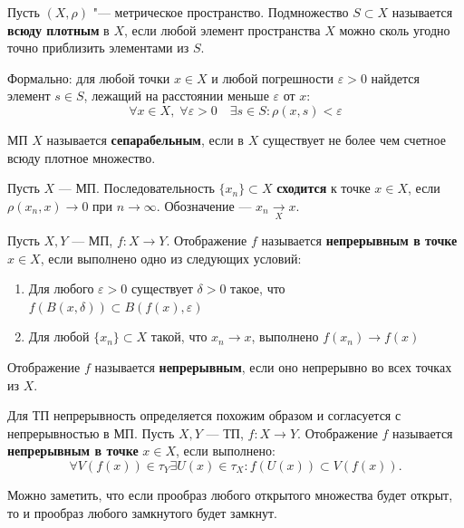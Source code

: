 \begin{definition}
	Пусть $(X, \rho)$ "--- метрическое пространство. Подмножество $S \subset X$ называется \textbf{всюду плотным} в $X$, если любой элемент пространства $X$ можно сколь угодно точно приблизить элементами из $S$.
	
	Формально: для любой точки $x \in X$ и любой погрешности $\varepsilon > 0$ найдется элемент $s \in S$, лежащий на расстоянии меньше $\varepsilon$ от $x$:
	\[ \forall x \in X, \; \forall \varepsilon > 0 \quad \exists s \in S : \rho(x, s) < \varepsilon \]
\end{definition}

\begin{definition}[Сепарабельность]
	МП $X$ называется \textbf{сепарабельным}, если в $X$ существует не более чем счетное всюду плотное множество.
\end{definition}

\begin{definition}[Сходимость]
	Пусть $X$ — МП. Последовательность $\{x_n\} \subset X$ \textbf{сходится} к точке $x \in X$, если $\rho(x_n, x) \to 0$ при $n \to \infty$. Обозначение — $x_n \xrightarrow[X]{} x$.
\end{definition}

\begin{definition}[Непрерывность в МП]
	Пусть $X, Y$ — МП, $f: X \to Y$. Отображение $f$ называется \textbf{непрерывным в точке} $x \in X$, если выполнено одно из следующих условий:
	\begin{enumerate}
		\item Для любого $\varepsilon > 0$ существует $\delta > 0$ такое, что $f(B(x, \delta)) \subset B(f(x), \varepsilon)$
		\item Для любой $\{x_n\} \subset X$ такой, что $x_n \to x$, выполнено $f(x_n) \to f(x)$
	\end{enumerate}
	Отображение $f$ называется \textbf{непрерывным}, если оно непрерывно во всех точках из $X$.
\end{definition}

\begin{remark}
	Для ТП непрерывность определяется похожим образом и согласуется с непрерывностью в МП. Пусть $X, Y$ — ТП, $f: X \to Y$. Отображение $f$ называется \textbf{непрерывным в точке} $x \in X$, если выполнено:
	\[ \forall V(f(x)) \in \tau_Y \exists U(x) \in \tau_X : f(U(x)) \subset V(f(x)). \]
\end{remark}

\begin{remark}
	Можно заметить, что если прообраз любого открытого множества будет открыт, то и прообраз любого замкнутого будет замкнут.
\end{remark}

